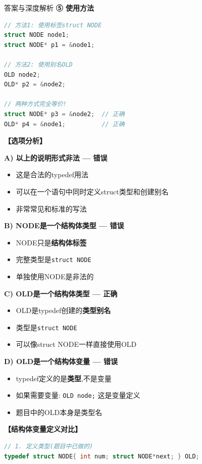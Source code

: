 \documentclass[a4paper,12pt]{article}
\begin{document}
\begin{bluebox}{答案与深度解析}
	\textbf{⑤ 使用方法}
	\begin{lstlisting}[language=C]
// 方法1: 使用标签struct NODE
struct NODE node1;
struct NODE* p1 = &node1;

// 方法2: 使用别名OLD
OLD node2;
OLD* p2 = &node2;

// 两种方式完全等价!
struct NODE* p3 = &node2;  // 正确
OLD* p4 = &node1;          // 正确
    \end{lstlisting}

	\textbf{【选项分析】}

	\textbf{A) 以上的说明形式非法 — 错误}
	\begin{itemize}[leftmargin=*, nosep]
		\item 这是合法的typedef用法
		\item 可以在一个语句中同时定义struct类型和创建别名
		\item 非常常见和标准的写法
	\end{itemize}

	\textbf{B) NODE是一个结构体类型 — 错误}
	\begin{itemize}[leftmargin=*, nosep]
		\item NODE只是\textbf{结构体标签}
		\item 完整类型是\texttt{struct NODE}
		\item 单独使用NODE是非法的
	\end{itemize}

	\textbf{C) OLD是一个结构体类型 — 正确}
	\begin{itemize}[leftmargin=*, nosep]
		\item OLD是typedef创建的\textbf{类型别名}
		\item 类型是\texttt{struct NODE}
		\item 可以像struct NODE一样直接使用OLD
	\end{itemize}

	\textbf{D) OLD是一个结构体变量 — 错误}
	\begin{itemize}[leftmargin=*, nosep]
		\item typedef定义的是\textbf{类型},不是变量
		\item 如果需要变量: \texttt{OLD node;} 这是变量定义
		\item 题目中的OLD本身是类型名
	\end{itemize}

	\textbf{【结构体变量定义对比】}
	\begin{lstlisting}[language=C]
// 1. 定义类型(题目中已做的)
typedef struct NODE{ int num; struct NODE*next; } OLD;


\end{lstlisting}
\end{bluebox}
\end{document}
